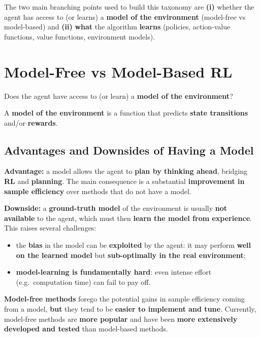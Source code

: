 \documentclass[11pt,a4paper]{article}
\theoremstyle{definition}
\theoremstyle{plain}
\theoremstyle{remark}
\begin{document}
The two main branching points used to build this taxonomy are \textbf{(i)} whether the agent has access to (or learns) a \textbf{model of the environment} (model-free vs model-based) and \textbf{(ii)} \textbf{what} the algorithm \textbf{learns} (policies, action-value functions, value functions, environment models).

\section{Model-Free vs Model-Based RL}

\begin{tcolorbox}[colback=red!5!white, colframe=red!70!black, title={Central Branching Point}]
Does the agent have access to (or learn) a \textbf{model of the environment}?
\end{tcolorbox}

A \textbf{model of the environment} is a function that predicts \textbf{state transitions} and/or \textbf{rewards}.

\subsection{Advantages and Downsides of Having a Model}

\textbf{Advantage:} a model allows the agent to \textbf{plan by thinking ahead}, bridging \textbf{RL} and \textbf{planning}. The main consequence is a substantial \textbf{improvement in sample efficiency} over methods that do not have a model.

\textbf{Downside:} a \textbf{ground-truth model} of the environment is usually \textbf{not available} to the agent, which must then \textbf{learn the model from experience}. This raises several challenges:
\begin{itemize}
    \item the \textbf{bias} in the model can be \textbf{exploited} by the agent: it may perform \textbf{well on the learned model} but \textbf{sub-optimally in the real environment};
    \item \textbf{model-learning is fundamentally hard}: even intense effort (e.g.\ computation time) can fail to pay off.
\end{itemize}

\textbf{Model-free methods} forego the potential gains in sample efficiency coming from a model, \textbf{but} they tend to be \textbf{easier to implement and tune}. Currently, model-free methods are \textbf{more popular} and have been \textbf{more extensively developed and tested} than model-based methods.
\end{document}
